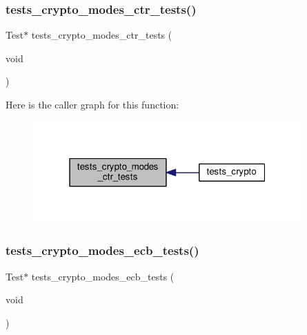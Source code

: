 \subsubsection{\texorpdfstring{tests\+\_\+crypto\+\_\+modes\+\_\+ctr\+\_\+tests()}{tests\_crypto\_modes\_ctr\_tests()}}
{\footnotesize\ttfamily Test$\ast$ tests\+\_\+crypto\+\_\+modes\+\_\+ctr\+\_\+tests (\begin{DoxyParamCaption}\item[{void}]{ }\end{DoxyParamCaption})}

Here is the caller graph for this function\+:
\nopagebreak
\begin{figure}[H]
\begin{center}
\leavevmode
\includegraphics[width=292pt]{group__unittests_ga504b19a263d14508528b1c378a3edee5_icgraph}
\end{center}
\end{figure}
\mbox{\label{group__unittests_ga76fd240d06e873ffb3cd5e75c7407de8}} 
\subsubsection{\texorpdfstring{tests\+\_\+crypto\+\_\+modes\+\_\+ecb\+\_\+tests()}{tests\_crypto\_modes\_ecb\_tests()}}
{\footnotesize\ttfamily Test$\ast$ tests\+\_\+crypto\+\_\+modes\+\_\+ecb\+\_\+tests (\begin{DoxyParamCaption}\item[{void}]{ }\end{DoxyParamCaption})}

